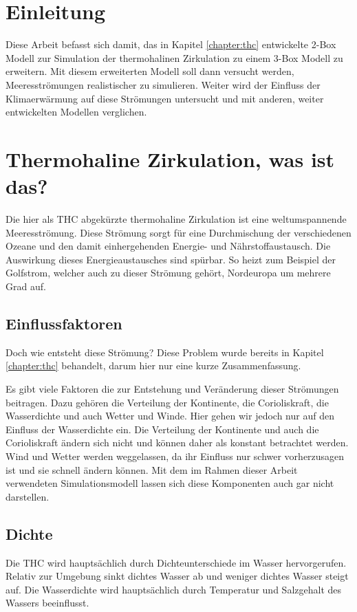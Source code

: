 \section{Einleitung}

Diese Arbeit befasst sich damit, das in Kapitel \ref{chapter:thc} entwickelte 2-Box Modell zur Simulation der thermohalinen Zirkulation zu einem 3-Box Modell zu erweitern. Mit diesem erweiterten Modell soll dann versucht werden, Meeresströmungen realistischer zu simulieren. Weiter wird der Einfluss der Klimaerwärmung auf diese Strömungen untersucht und mit anderen, weiter entwickelten Modellen verglichen.

\section{Thermohaline Zirkulation, was ist das?}

Die hier als THC abgekürzte thermohaline Zirkulation ist eine weltumspannende Meeresströmung.
Diese Strömung sorgt für eine Durchmischung der verschiedenen Ozeane und den damit einhergehenden Energie- und Nährstoffaustausch. 
Die Auswirkung dieses Energieaustausches sind spürbar. So heizt zum Beispiel der Golfstrom, welcher auch zu dieser Strömung gehört, Nordeuropa um mehrere Grad auf.


\subsection{Einflussfaktoren}
Doch wie entsteht diese Strömung? 
Diese Problem wurde bereits in Kapitel \ref{chapter:thc} behandelt, darum hier nur eine kurze Zusammenfassung.

Es gibt viele Faktoren die zur Entstehung und Veränderung dieser Strömungen beitragen. Dazu gehören die Verteilung der Kontinente, die Corioliskraft, die Wasserdichte und auch Wetter und Winde. Hier gehen wir jedoch nur auf den Einfluss der Wasserdichte ein.
Die Verteilung der Kontinente und auch die Corioliskraft ändern sich nicht und können daher als konstant betrachtet werden. Wind und Wetter werden weggelassen, da ihr Einfluss nur schwer vorherzusagen ist und sie schnell ändern können. Mit dem im Rahmen dieser Arbeit verwendeten Simulationsmodell lassen sich diese Komponenten auch gar nicht darstellen.

\subsection{Dichte}
Die THC wird hauptsächlich durch Dichteunterschiede im Wasser hervorgerufen.
Relativ zur Umgebung sinkt dichtes Wasser ab und weniger dichtes Wasser steigt auf. Die Wasserdichte wird hauptsächlich durch Temperatur und Salzgehalt des Wassers beeinflusst.

